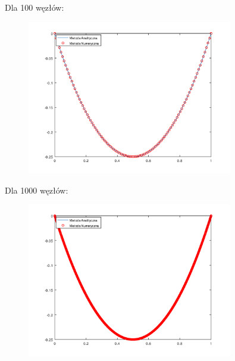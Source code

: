 \newpage
\begin{samepage}
    
    Dla 100 węzłów:
    \begin{figure}[!ht]
        \begin{center}
            \includegraphics[width=0.8\textwidth]{Lab4/charts/zad3/zad3_n_100.png}
        \end{center}
    \end{figure}
    \FloatBarrier
\end{samepage}


\begin{samepage}
    Dla 1000 węzłów:
    
    \begin{figure}[!ht]
        \begin{center}
            \includegraphics[width=0.8\textwidth]{Lab4/charts/zad3/zad3_n_1000.png}
        \end{center}
    \end{figure}
    \FloatBarrier
\end{samepage}    

